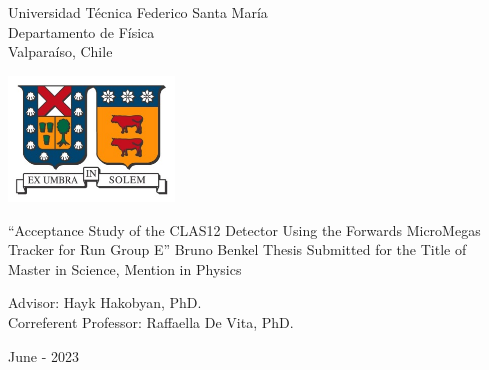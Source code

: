 \begin{titlepage}
\begin{center}
    \noindent
    \fontsize{18}{22}\selectfont Universidad T\'ecnica Federico Santa Mar\'ia \\
    \fontsize{16}{19}\selectfont Departamento de F\'isica \\
    \fontsize{16}{19}\selectfont Valpara\'iso, Chile \\
    \vspace{1.5cm}

    \includegraphics[width=4.41cm,height=3.34cm]{00firstpages/img/utfsm_shield.jpg}
    \vspace{1.5cm}

    \fontsize{20}{24}\selectfont ``Acceptance Study of the CLAS12 Detector Using the Forwards MicroMegas Tracker for Run Group E''
    \vfill
    \fontsize{16}{19}\selectfont Bruno Benkel
    \vfill
    \fontsize{16}{19}\selectfont Thesis Submitted for the Title of \\ Master in Science, Mention in Physics
    \vspace{1.5cm}

    \fontsize{14}{17}\selectfont Advisor: Hayk Hakobyan, PhD. \\
    \fontsize{14}{17}\selectfont Correferent Professor: Raffaella De Vita, PhD. %
    \vspace{2.5cm}

    \fontsize{14}{17}\selectfont June - 2023
\end{center}
\end{titlepage}

       \pagebreak
 \pagebreak
         \pagebreak
         \pagebreak
\tableofcontents                        \pagebreak
{} {}
\listoffigures                          \pagebreak
